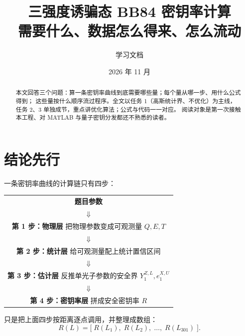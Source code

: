 \documentclass[UTF8,11pt,a4paper]{ctexart}
\title{\bfseries 三强度诱骗态 BB84 密钥率计算\\[6pt]
       \large 需要什么、数据怎么得来、怎么流动}
\author{\code{qkd_decoy_sim} 学习文档}
\date{2026 年 11 月}
\newcommand{\code}[1]{\texttt{\detokenize{#1}}}
\newcommand{\YoneZ}{Y_1^{Z,L}}
\newcommand{\eoneX}{e_1^{X,U}}
\begin{document}
\maketitle
\thispagestyle{empty}

\begin{abstract}
本文回答三个问题：算一条密钥率曲线到底需要哪些量；每个量从哪一步、用什么公式得到；
这些量按什么顺序流过程序。全文以任务 1（高斯统计界、不优化）为主线，
任务 2、3 单独成节，重点讲优化算法；公式与代码一一对应。
阅读对象是第一次接触本工程、对 MATLAB 与量子密钥分发都还不熟悉的读者。
\end{abstract}

\tableofcontents
\newpage

\section{结论先行}

一条密钥率曲线的计算链只有四步：

\begin{center}
\renewcommand{\arraystretch}{1.45}
\begin{tabular}{c}
\textbf{题目参数} \code{p} \\[2pt]
$\Downarrow$ \\
\textbf{第 1 步：物理层} \code{gain.m} \quad 把物理参数变成可观测量 $Q,E,T$ \\[2pt]
$\Downarrow$ \\
\textbf{第 2 步：统计层} \code{fluct.m} \quad 给可观测量配上统计置信区间 \\[2pt]
$\Downarrow$ \\
\textbf{第 3 步：估计层} \code{estimate.m} \quad 反推单光子参数的安全界 $\YoneZ,\eoneX$ \\[2pt]
$\Downarrow$ \\
\textbf{第 4 步：密钥率层} \code{keyRateAt.m} \quad 拼成安全密钥率 $R$
\end{tabular}
\end{center}

\code{runCase.m} 只是把上面四步按距离逐点调用，并整理成数组：
\[
R(L)=\bigl[\;R(L_1),\;R(L_2),\;\ldots,\;R(L_{301})\;\bigr].
\]

\begin{center}
\end{center}
\end{document}
